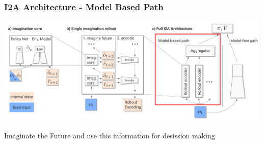 \begin{frame}
    \frametitle{I2A Architecture - Model Based Path}


\includegraphics[width=\columnwidth]{./Images/i2a_all_model_based_path.png}%

\begin{PraesentationAufzaehlung}
	\item Imaginate the Future and use this information for desission making
\end{PraesentationAufzaehlung}
    
\end{frame}
\clearpage

